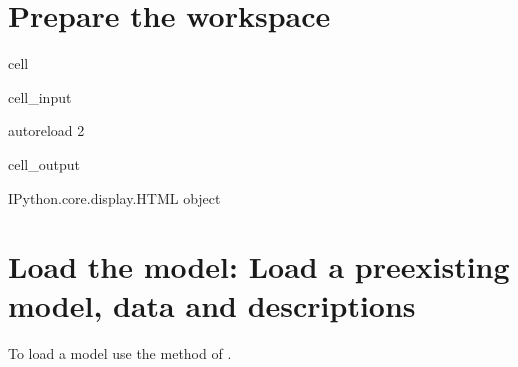 \documentclass[letterpaper,10pt,english]{jupyterBook}
\begin{document}
\section{Prepare the workspace}
\label{\detokenize{content/05_WBModels/LoadingWBModel:prepare-the-workspace}}
\begin{sphinxuseclass}{cell}\begin{sphinxVerbatimInput}

\begin{sphinxuseclass}{cell_input}
\begin{sphinxVerbatim}[commandchars=\\\{\}]
    
        

   

   

 autoreload   
 2
\end{sphinxVerbatim}

\end{sphinxuseclass}\end{sphinxVerbatimInput}
\begin{sphinxVerbatimOutput}

\begin{sphinxuseclass}{cell_output}
\begin{sphinxVerbatim}[commandchars=\\\{\}]
\PYGZlt{}IPython.core.display.HTML object\PYGZgt{}
\end{sphinxVerbatim}

\end{sphinxuseclass}\end{sphinxVerbatimOutput}

\end{sphinxuseclass}

\section{Load the model: Load a pre\sphinxhyphen{}existing model, data and descriptions}
\label{\detokenize{content/05_WBModels/LoadingWBModel:load-the-model-load-a-pre-existing-model-data-and-descriptions}}
\sphinxAtStartPar
To load a model use the  method of .
\end{document}

